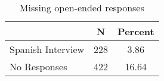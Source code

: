 \begin{table}[ht]
\centering
\caption{Missing open-ended responses} 
\label{tab:app_mis}
\begin{tabular}{lcc}
  \hline
 & N & Percent \\ 
  \hline
Spanish Interview & 228 & 3.86 \\ 
  No Responses & 422 & 16.64 \\ 
   \hline
\end{tabular}
\end{table}
